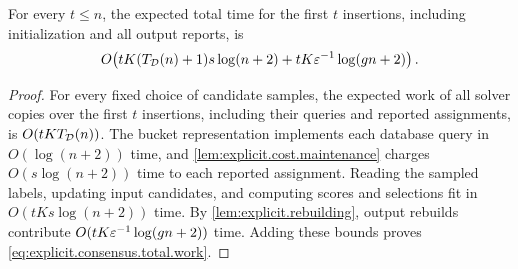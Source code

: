 \begin{lemma}\label{lem:explicit.total.work}
For every $ t\le n $, the expected total time for the first $ t $ insertions, including initialization and all output reports, is
\begin{align}
    O\!\left(
        tK(T_{\mathcal D}(n)+1)s\log(n+2)
        +tK\varepsilon^{-1}\log(gn+2)
    \right).
    \label{eq:explicit.consensus.total.work}
\end{align}
\end{lemma}
\begin{proof}
For every fixed choice of candidate samples, the expected work of all solver copies over the first $ t $ insertions, including their queries and reported assignments, is $ O(tKT_{\mathcal D}(n)) $.
The bucket representation implements each database query in $ O(\log(n+2)) $ time, and \cref{lem:explicit.cost.maintenance} charges $ O(s\log(n+2)) $ time to each reported assignment.
Reading the sampled labels, updating input candidates, and computing scores and selections fit in $ O(tKs\log(n+2)) $ time.
By \cref{lem:explicit.rebuilding}, output rebuilds contribute $ O(tK\varepsilon^{-1}\log(gn+2)) $ time.
Adding these bounds proves \eqref{eq:explicit.consensus.total.work}.
\end{proof}

